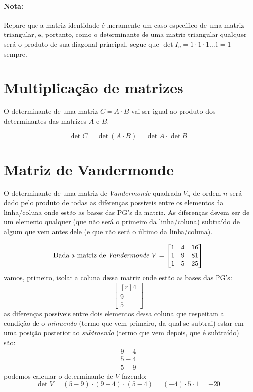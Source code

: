 \paragraph{Nota:}
Repare que a matriz identidade é meramente um caso específico de uma matriz triangular, e, portanto, como o determinante de uma matriz triangular qualquer será o produto de sua diagonal principal, segue que $\det I_n=1\cdot 1\cdot1\dots1=1$ sempre.

\section{Multiplicação de matrizes}

O determinante de uma matriz $C=A\cdot B$ vai ser igual ao produto dos determinantes das matrizes $A$ e $B$.

$$
\det C=\det (A\cdot B) = \det A \cdot \det B
$$

\section{Matriz de Vandermonde}

O determinante de uma matriz de \textit{Vandermonde} quadrada $V_n$ de ordem $n$ será dado pelo produto de todas as diferenças possíveis entre os elementos da linha/coluna onde estão as bases das PG's da matriz. As diferenças devem ser de um elemento qualquer (que não será o primeiro da linha/coluna) subtraído de algum que vem antes dele (e que não será o último da linha/coluna).

\Example


$$
\text{Dada a matriz de \textit{Vandermonde} }V=\begin{bmatrix*}[r]
1 & 4 & 16\\
1 & 9 & 81\\
1 & 5 & 25
\end{bmatrix*}
$$
vamos, primeiro, isolar a coluna dessa matriz onde estão as bases das PG's:
$$
\begin{bmatrix*}[r]
4\\9\\5
\end{bmatrix*}
$$
as diferenças possíveis entre dois elementos dessa coluna que respeitam a condição de o \textit{minuendo} (termo que vem primeiro, da qual se subtrai) estar em uma posição posterior ao \textit{subtraendo} (termo que vem depois, que é subtraído) são:
\begin{gather*}
    9-4\\
    5-4\\
    5-9
\end{gather*}
podemos calcular o determinante de $V$ fazendo:
$$
\det V=(5-9)\cdot(9-4)\cdot(5-4)=(-4)\cdot5\cdot1=-20
$$
